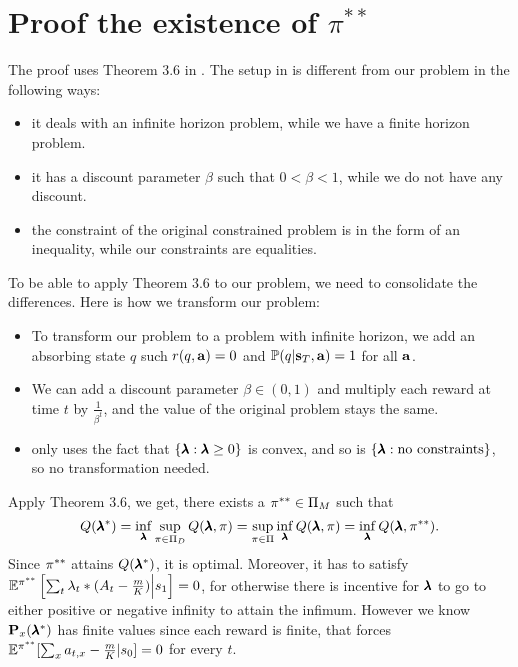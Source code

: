 \section{Proof the existence of $\pi^{**}$}\label{ap:exist}
The proof uses Theorem 3.6 in \cite{AltmanBook}. 
The setup in \cite{AltmanBook} is different from our problem in the following ways:
\begin{itemize}
    \item it deals with an infinite horizon problem, while we have a finite horizon problem.
    \item it has a discount parameter $\beta$ such that $0<\beta<1$, while we do not have any discount.
    \item the constraint of the original constrained problem is in the form of an inequality, while our constraints are equalities.
\end{itemize}
To be able to apply Theorem 3.6 to our problem, we need to consolidate the differences. Here is how we transform our problem:
\begin{itemize}
    \item To transform our problem to a problem with infinite horizon, we add an absorbing state $q$ such $r(q,\mathbf{a}) = 0$ and $\mathbb{P}(q|\mathbf{s}_T,\mathbf{a})=1$ for all $\mathbf{a}$.
    \item We can add a discount parameter $\beta\in(0,1)$ and multiply each reward at time $t$ by $\frac{1}{\beta^{t}}$, and the value of the original problem stays the same.
    \item \cite{AltmanBook} only uses the fact that $\{\pmb{\lambda}:\pmb{\lambda} \geq 0\}$ is convex, and so is $\{\pmb{\lambda}: \text{no constraints}\}$, so no transformation needed.
\end{itemize}
Apply Theorem 3.6, we get, there exists a $\pi^{**}\in {\Pi}_{M}$ such that
\begin{equation}\label{switch}
Q(\pmb{\lambda}^*)=\inf_{\pmb{\lambda}}\sup_{\pi\in \Pi_{D}} Q(\pmb{\lambda}, \pi)= \sup_{\pi\in \Pi}\inf_{\pmb{\lambda}} Q(\pmb{\lambda},\pi) = \inf_{\pmb{\lambda}}Q(\pmb{\lambda}, \pi^{**}).
\end{equation}
Since $\pi^{**}$ attains $Q(\pmb{\lambda}^*)$, it is optimal. Moreover, it has to satisfy $\mathbb{E}^{\pi^{**}}\left[\sum_{t}\lambda_t*(A_t-\frac{m}{K})\Big | s_1\right]= 0$, for otherwise there is incentive for $\pmb{\lambda}$ to go to either positive or negative infinity to attain the infimum. However we know $\mathbf{P}_x(\pmb{\lambda}^*)$ has finite values since each reward is finite, that forces $\mathbb{E}^{\pi^{**}}[\sum_x a_{t,x}-\frac{m}{K}|s_0]= 0$ for every $t$. 

